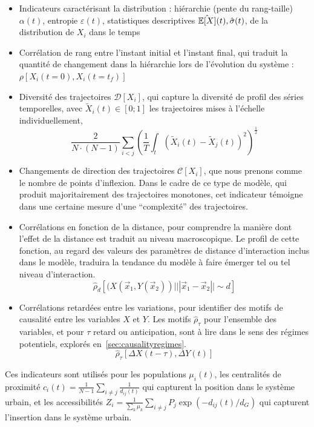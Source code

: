 \begin{itemize}
  \item Indicateurs caractérisant la distribution : hiérarchie (pente du rang-taille) $\alpha (t)$, entropie $\varepsilon (t)$, statistiques descriptives $\hat{\operatorname{\mathbb{E}}\!\left[X\right]} (t), \hat{\sigma} (t)$, de la distribution de $X_i$ dans le temps
  \item Corrélation de rang entre l'instant initial et l'instant final, qui traduit la quantité de changement dans la hiérarchie lors de l'évolution du système : $\rho\left[X_i(t=0),X_i(t=t_f)\right]$
  \item Diversité des trajectoires $\mathcal{D}\left[X_i\right]$, qui capture la diversité de profil des séries temporelles, avec $\tilde{X}_i(t)\in \left[0;1\right]$ les trajectoires mises à l'échelle individuellement,
\[
\frac{2}{N\cdot(N-1)}\sum_{i<j} \left(\frac{1}{T}\int_{t} \left(\tilde{X}_i(t) - \tilde{X}_j(t)\right)^2 \right)^{\frac{1}{2}}
\]
\item Changements de direction des trajectoires $\mathcal{C}\left[X_i\right]$, que nous prenons comme le nombre de points d'inflexion. Dans le cadre de ce type de modèle, qui produit majoritairement des trajectoires monotones, cet indicateur témoigne dans une certaine mesure d'une ``complexité'' des trajectoires.
\item Corrélations en fonction de la distance, pour comprendre la manière dont l'effet de la distance est traduit au niveau macroscopique. Le profil de cette fonction, au regard des valeurs des paramètres de distance d'interaction inclus dans le modèle, traduira la tendance du modèle à faire émerger tel ou tel niveau d'interaction.
\[
\hat{\rho}_d\left[(X(\vec{x}_1,Y(\vec{x}_2))|||\vec{x}_1-\vec{x}_2||\sim d\right]
\]
\item Corrélations retardées entre les variations, pour identifier des motifs de causalité entre les variables $X$ et $Y$. Les motifs $\hat{\rho}_{\tau}$ pour l'ensemble des variables, et pour $\tau$ retard ou anticipation, sont à lire dans le sens des régimes potentiels, explorés en~\ref{sec:causalityregimes}.
\[
\hat{\rho}_{\tau}\left[\Delta X(t-\tau),\Delta Y(t)\right]
\]
\end{itemize}

Ces indicateurs sont utilisés pour les populations $\mu_i(t)$, les centralités de proximité $c_i(t) = \frac{1}{N-1}\sum_{i\neq j} \frac{1}{d_{ij}(t)}$ qui capturent la position dans le système urbain, et les accessibilités $Z_i = \frac{1}{\sum_k \mu_k}\sum_{i\neq j} P_j \exp{\left(- d_{ij}(t)/d_G\right)}$ qui capturent l'insertion dans le système urbain.



